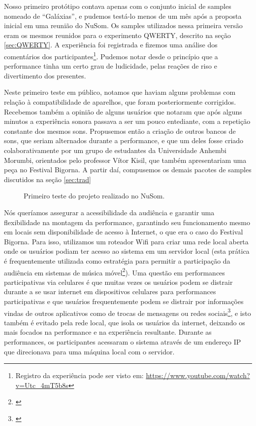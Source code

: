 Nosso primeiro protótipo contava apenas com o conjunto inicial de samples nomeado de ``Galáxias'', e pudemos testá-lo menos de um mês após a proposta inicial em uma reunião do NuSom. Os samples utilizados nessa primeira versão eram os mesmos reunidos para o experimento QWERTY, descrito na seção \ref{sec:QWERTY}. A experiência foi registrada e fizemos uma análise dos comentários dos participantes\footnote{Registro da experiência pode ser visto em: \url{https://www.youtube.com/watch?v=Utc_4mT5b8s}}. Pudemos notar desde o princípio que a performance tinha um certo grau de ludicidade, pelas reações de riso e divertimento dos presentes. 


Neste primeiro teste em público, notamos que haviam alguns problemas com relação à compatibilidade de aparelhos, que foram posteriormente corrigidos. Recebemos também a opinião de alguns usuários que notaram que após alguns minutos a experiência sonora passava a ser um pouco entediante, com a repetição constante dos mesmos sons. Propusemos então a criação de outros bancos de sons, que seriam alternados durante a performance, e que um deles fosse criado colaborativamente por um grupo de estudantes da Universidade Anhembi Morumbi, orientados pelo professor Vítor Kisil,  que também apresentariam uma peça no Festival Bigorna. A partir daí, compusemos os demais pacotes de samples discutidos na seção \ref{sec:trad}



\begin{figure}
   
   \caption{Primeiro teste do projeto realizado no NuSom.}
    \label{fig:testenusom}
 \end{figure}
Nós queríamos assegurar a acessibilidade da audiência e garantir uma flexibilidade na montagem da performance, garantindo seu funcionamento mesmo em locais sem disponibilidade de acesso à Internet, o que era o caso do Festival Bigorna. Para isso, utilizamos um roteador Wifi para criar uma rede local aberta onde os usuários podiam ter acesso ao sistema em um servidor local (esta prática é frequentemente utilizada como estratégia para permitir a participação da audiência em sistemas de música móvel\footnote{\cite{Lambert:2016}}). Uma questão em performances participativas via celulares é que muitas vezes os usuários podem se distrair durante a se usar internet em dispositivos celulares para performances participativas e que usuários frequentemente podem se distrair por informações vindas de outros aplicativos como de trocas de mensagens ou redes sociais\footnote{\cite{wu2017open}}, e isto também é evitado pela rede local, que isola os usuários da internet, deixando os mais focados na performance e na experiência resultante. Durante as performances, os participantes acessaram o sistema através de um endereço IP que direcionava para uma máquina local com o servidor.

